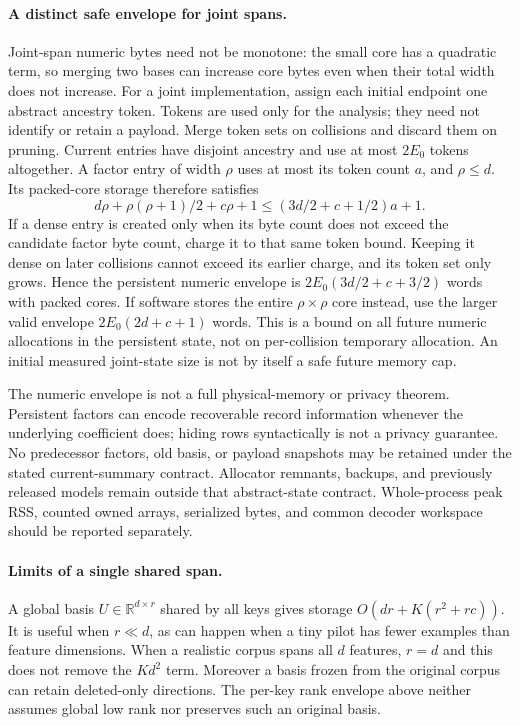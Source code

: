 \paragraph{A distinct safe envelope for joint spans.}
Joint-span numeric bytes need not be monotone: the small core has a
quadratic term, so merging two bases can increase core bytes even when their
total width does not increase. For a joint implementation, assign each
initial endpoint one abstract ancestry token. Tokens are used only for the
analysis; they need not identify or retain a payload. Merge token sets on
collisions and discard them on pruning. Current entries have disjoint
ancestry and use at most $2E_0$ tokens altogether. A factor entry of width
$\rho$ uses at most its token count $a$, and $\rho\le d$. Its packed-core
storage therefore satisfies
\[
 d\rho+\rho(\rho+1)/2+c\rho+1
 \le (3d/2+c+1/2)a+1.
\]
If a dense entry is created only when its byte count does not exceed the
candidate factor byte count, charge it to that same token bound. Keeping it
dense on later collisions cannot exceed its earlier charge, and its token
set only grows. Hence the persistent numeric envelope is
$2E_0(3d/2+c+3/2)$ words with packed cores. If software stores the entire
$\rho\times\rho$ core instead, use the larger valid envelope
$2E_0(2d+c+1)$ words. This is a bound on all future numeric allocations in
the persistent state, not on per-collision temporary allocation. An initial
measured joint-state size is not by itself a safe future memory cap.

The numeric envelope is not a full physical-memory or privacy theorem.
Persistent factors can encode recoverable record information whenever the
underlying coefficient does; hiding rows syntactically is not a privacy
guarantee. No predecessor factors, old basis, or payload snapshots may be
retained under the stated current-summary contract. Allocator remnants,
backups, and previously released models remain outside that abstract-state
contract. Whole-process peak RSS, counted owned arrays, serialized bytes,
and common decoder workspace should be reported separately.

\paragraph{Limits of a single shared span.}
A global basis $U\in\mathbb R^{d\times r}$ shared by all keys gives storage
$O(dr+K(r^2+rc))$. It is useful when $r\ll d$, as can happen when a tiny
pilot has fewer examples than feature dimensions. When a realistic corpus
spans all $d$ features, $r=d$ and this does not remove the $Kd^2$ term.
Moreover a basis frozen from the original corpus can retain deleted-only
directions. The per-key rank envelope above neither assumes global low rank
nor preserves such an original basis.

